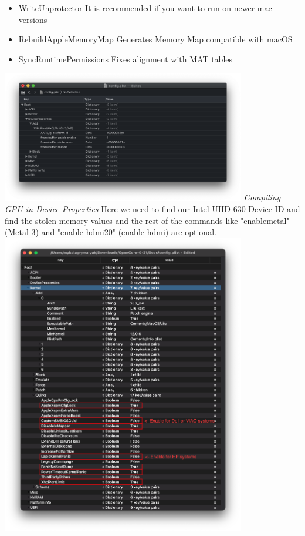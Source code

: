 \documentclass[12pt, letterpaper]{article}
\begin{document}
\begin{itemize}
    \item WriteUnprotector
    \break
    It is recommended if you want to run on newer mac versions
    \item RebuildAppleMemoryMap
    \break
    Generates Memory Map compatible with macOS
    \item SyncRuntimePermissions
    \break
    Fixes alignment with MAT tables
\end{itemize}
\hfill\break
\hfill\break
\includegraphics[width=0.8\textwidth]{fotos/PSP/Propertree/Deviceproperties.png}
\break
\emph{Compiling GPU in Device Properties}
\hfill\break
\hfill\break
Here we need to find our Intel UHD 630 Device ID and find the stolen memory values and the rest of the commands like "enablemetal" (Metal 3) and "enable-hdmi20" (enable hdmi) are optional.
\hfill\break
\hfill\break
\includegraphics[width=0.8\textwidth]{fotos/PSP/Propertree/Kernel.png}
\end{document}
